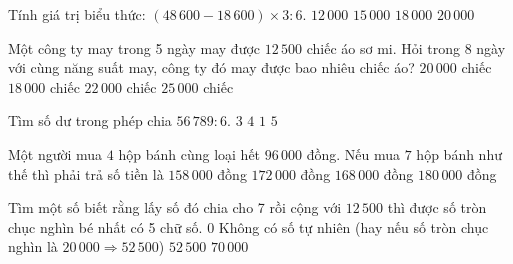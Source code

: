 \begin{ex} %
Tính giá trị biểu thức: $(48\,600 - 18\,600) \times 3 : 6$.
\choice
{$12\,000$}
{\True $15\,000$}
{$18\,000$}
{$20\,000$}
\end{ex}

\begin{ex} %
Một công ty may trong 5 ngày may được $12\,500$ chiếc áo sơ mi. Hỏi trong 8 ngày với cùng năng suất may, công ty đó may được bao nhiêu chiếc áo?
\choice
{\True $20\,000$ chiếc}
{$18\,000$ chiếc}
{$22\,000$ chiếc}
{$25\,000$ chiếc}
\end{ex}

\begin{ex} %
Tìm số dư trong phép chia $56\,789 : 6$.
\choice
{$3$}
{$4$}
{$1$}
{\True $5$}
\end{ex}

\begin{ex} %
Một người mua $4$ hộp bánh cùng loại hết $96\,000$ đồng. Nếu mua $7$ hộp bánh như thế thì phải trả số tiền là
\choice
{$158\,000$ đồng}
{$172\,000$ đồng}
{\True $168\,000$ đồng}
{$180\,000$ đồng}
\end{ex}

\begin{ex} %
Tìm một số biết rằng lấy số đó chia cho 7 rồi cộng với $12\,500$ thì được số tròn chục nghìn bé nhất có 5 chữ số.
\choice
{$0$}
{\True Không có số tự nhiên (hay nếu số tròn chục nghìn là $20\,000 \Rightarrow 52\,500$)}
{$52\,500$}
{$70\,000$}
\end{ex}

